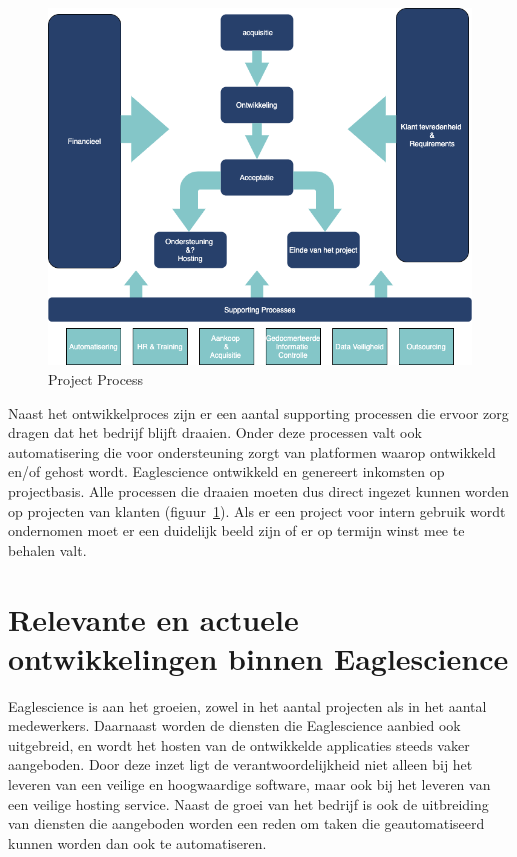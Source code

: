 \begin{figure}[bth]
\myfloatalign
\includegraphics[width=12cm]{gfx/ProcessFlow}
\caption{Project Process}
\label{fig:Project Process}
\end{figure}

Naast het ontwikkelproces zijn er een aantal supporting processen die ervoor zorg dragen dat het bedrijf blijft draaien. Onder deze processen valt ook automatisering die voor ondersteuning zorgt van platformen waarop ontwikkeld en/of gehost wordt. Eaglescience ontwikkeld en genereert inkomsten op projectbasis. Alle processen die draaien moeten dus direct ingezet kunnen worden op projecten van klanten (figuur~\ref{fig:Project Process}). Als er een project voor intern gebruik wordt ondernomen moet er een duidelijk beeld zijn of er op termijn winst mee te behalen valt.

\section{Relevante en actuele ontwikkelingen binnen Eaglescience}\label{sec:relevante-en-actuele-ontwikkelingen-binnen-Eaglescience}

Eaglescience is aan het groeien, zowel in het aantal projecten als in het aantal medewerkers. Daarnaast worden de diensten die Eaglescience aanbied ook uitgebreid, en wordt het hosten van de ontwikkelde applicaties steeds vaker aangeboden. Door deze inzet ligt de verantwoordelijkheid niet alleen bij het leveren van een veilige en hoogwaardige software, maar ook bij het leveren van een veilige hosting service. Naast de groei van het bedrijf is ook de uitbreiding van diensten die aangeboden worden een reden om taken die geautomatiseerd kunnen worden dan ook te automatiseren.

